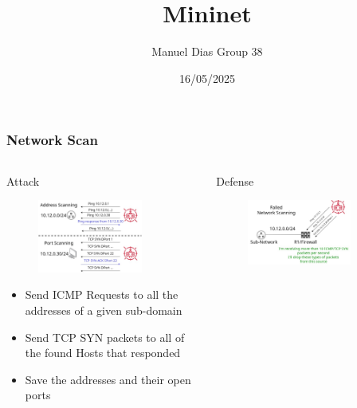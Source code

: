 \documentclass{beamer}
\title{Mininet}
\author{Manuel Dias Group 38}
\institute{UCLouvain}
\date{16/05/2025}
\begin{document}
\frame{\titlepage}


\begin{frame}
\frametitle{Network Scan}
\begin{columns}
    \begin{column}{0.5\textwidth}
        \Large Attack
        \begin{figure}
            \centering
            \includegraphics[width=0.8\textwidth]{scan_attack.jpg}\\
        \end{figure}
            \begin{itemize}[label={}]
                \item \footnotesize Send ICMP Requests to all the addresses of a given sub-domain
                \item \footnotesize Send TCP SYN packets to all of the found Hosts that responded
               \item \footnotesize  Save the addresses and their open ports
            \end{itemize}
    \end{column}
    \begin{column}{0.5\textwidth}
        \Large Defense
        \begin{figure}
            \centering
            \includegraphics[width=0.8\textwidth]{scan_defense.jpg}\\

\end{figure}
\end{column}
\end{columns}
\end{frame}
\end{document}
